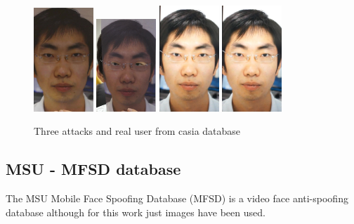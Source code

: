 \begin{figure}[htb]
\centering
\includegraphics[width=0.2\textwidth]{images_databases/casia/at1-1.jpg}
\includegraphics[width=0.2\textwidth]{images_databases/casia/at2-1.jpg}
\includegraphics[width=0.2\textwidth]{images_databases/casia/at3-1.jpg}
\includegraphics[width=0.2\textwidth]{images_databases/casia/real1.jpg}

\caption{Three attacks and real user from casia database } \label{fig:casia1}
\end{figure}

\subsection{MSU - MFSD database}
The MSU Mobile Face Spoofing Database (MFSD) is a video face anti-spoofing database although for this work just images have been used.\\

